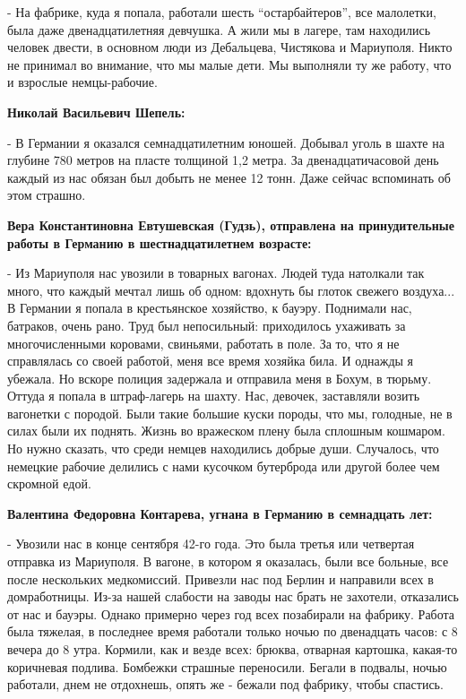 - На фабрике, куда я попала, работали шесть \enquote{остарбайтеров}, все малолетки,
была даже двенадцатилетняя девчушка. А жили мы в лагере, там находились человек
двести, в основном люди из Дебальцева, Чистякова и Мариуполя. Никто не принимал
во внимание, что мы малые дети. Мы выполняли ту же работу, что и взрослые
немцы-рабочие.

\textbf{Николай Васильевич Шепель:}

- В Германии я оказался семнадцатилетним юношей. Добывал уголь в шахте на
глубине 780 метров на пласте толщиной 1,2 метра. За двенадцатичасовой день
каждый из нас обязан был добыть не менее 12 тонн. Даже сейчас вспоминать об
этом страшно.

\textbf{Вера Константиновна Евтушевская (Гудзь), отправлена на принудительные работы в
Германию в шестнадцатилетнем возрасте:}

- Из Мариуполя нас увозили в товарных вагонах. Людей туда натолкали так много,
что каждый мечтал лишь об одном: вдохнуть бы глоток свежего воздуха... В
Германии я попала в крестьянское хозяйство, к бауэру. Поднимали нас, батраков,
очень рано. Труд был непосильный: приходилось ухаживать за многочисленными
коровами, свиньями, работать в поле. За то, что я не справлялась со своей
работой, меня все время хозяйка била. И однажды я убежала. Но вскоре полиция
задержала и отправила меня в Бохум, в тюрьму. Оттуда я попала в штраф-лагерь на
шахту. Нас, девочек, заставляли возить вагонетки с породой. Были такие большие
куски породы, что мы, голодные, не в силах были их поднять. Жизнь во вражеском
плену была сплошным кошмаром. Но нужно сказать, что среди немцев находились
добрые души. Случалось, что немецкие рабочие делились с нами кусочком
бутерброда или другой более чем скромной едой.

\textbf{Валентина Федоровна Контарева, угнана в Германию в семнадцать лет:}

- Увозили нас в конце сентября 42-го года. Это была третья или четвертая
отправка из Мариуполя. В вагоне, в котором я оказалась, были все больные, все
после нескольких медкомиссий. Привезли нас под Берлин и направили всех в
домработницы. Из-за нашей слабости на заводы нас брать не захотели, отказались
от нас и бауэры. Однако примерно через год всех позабирали на фабрику. Работа
была тяжелая, в последнее время работали только ночью по двенадцать часов: с 8
вечера до 8 утра. Кормили, как и везде всех: брюква, отварная картошка,
какая-то коричневая подлива. Бомбежки страшные переносили. Бегали в подвалы,
ночью работали, днем не отдохнешь, опять же - бежали под фабрику, чтобы
спастись.

